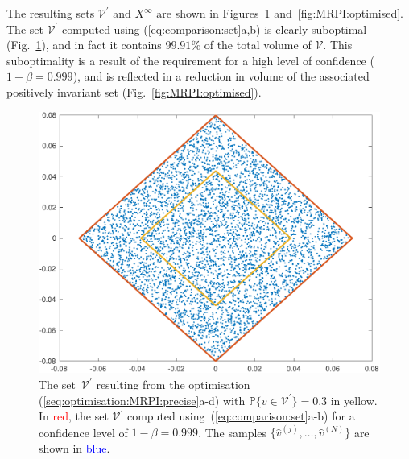 \documentclass{ifacconf}
\providecommand{\V}{\mathcal V}
\providecommand{\PP}{\mathbb P}
\begin{document}
The resulting sets $\V^\prime$ and $X^\infty$ are shown in Figures~\ref{figure:V:prime:and:comparison} and~\ref{fig:MRPI:optimised}. 
%
The set $\V^\prime$ computed using (\ref{eq:comparison:set}a,b) is clearly suboptimal (Fig.~\ref{figure:V:prime:and:comparison}), and in fact it contains $99.91$\% of the total volume of $\V$. 
This suboptimality is a result of the requirement for a high level of confidence ($1-\beta = 0.999$), and is reflected in a reduction in volume of the associated positively invariant set (Fig.~\ref{fig:MRPI:optimised}).

%
\begin{figure}
\includegraphics[width=0.99\linewidth]{Vprime.pdf}
\caption{The set~$\V^\prime$ resulting from the
  optimisation \mbox{(\ref{seq:optimisation:MRPI:precise}a-d)}
with
  $\PP\{v\in\V^\prime\}=0.3$
in \textcolor[rgb]{0.9255,0.6902,0.2078}{yellow}. In \textcolor{red}{red}, the set $\V^\prime$
  computed using~(\ref{eq:comparison:set}a-b) for a confidence level of $1-\beta=0.999$. The 
  samples $\{\hat{v}^{(j)},\ldots,\hat{v}^{(N)}\}$ are shown in \textcolor{blue}{blue}.}
\label{figure:V:prime:and:comparison}
\vspace{2mm}
\end{figure}
\end{document}
